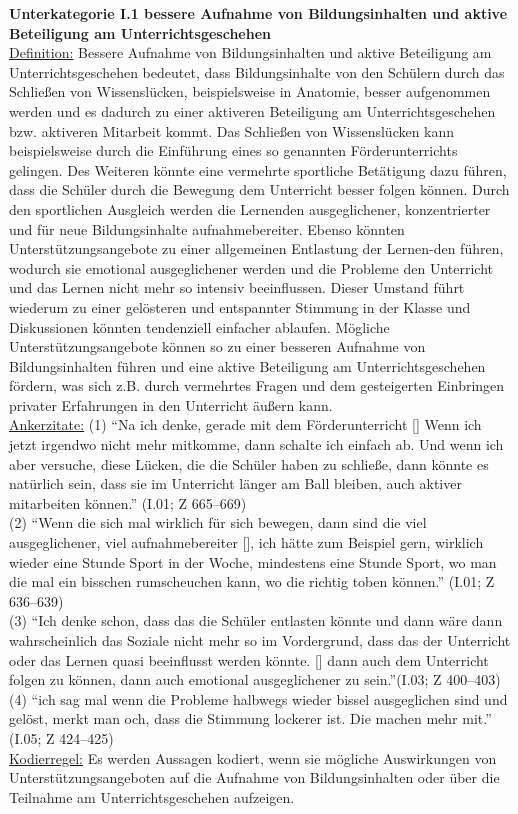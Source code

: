\noindent
\textbf{Unterkategorie I.1 bessere Aufnahme von Bildungsinhalten und aktive Beteiligung am Unterrichtsgeschehen}\\
\underline{Definition:} Bessere Aufnahme von Bildungsinhalten und aktive Beteiligung am Unterrichtsgeschehen bedeutet, dass Bildungsinhalte von den Schülern durch das Schließen von Wissenslücken, beispielsweise in Anatomie, besser aufgenommen werden und es dadurch zu einer aktiveren Beteiligung am Unterrichtsgeschehen bzw. aktiveren Mitarbeit kommt. Das Schließen von Wissenslücken kann beispielsweise durch die Einführung eines so genannten Förderunterrichts gelingen. Des Weiteren könnte eine vermehrte sportliche Betätigung dazu führen, dass die Schüler durch die Bewegung dem Unterricht besser folgen können. Durch den sportlichen Ausgleich werden die Lernenden ausgeglichener, konzentrierter und für neue Bildungsinhalte aufnahmebereiter. Ebenso könnten Unterstützungsangebote zu einer allgemeinen Entlastung der Lernen-den führen, wodurch sie emotional ausgeglichener werden und die Probleme den Unterricht und das Lernen nicht mehr so intensiv beeinflussen. Dieser Umstand führt wiederum zu einer gelösteren und entspannter Stimmung in der Klasse und Diskussionen könnten tendenziell einfacher ablaufen. Mögliche Unterstützungsangebote können so zu einer besseren Aufnahme von Bildungsinhalten führen und eine aktive Beteiligung am Unterrichtsgeschehen fördern, was sich z.B. durch vermehrtes Fragen und dem gesteigerten Einbringen privater Erfahrungen in den Unterricht äußern kann.\\
\underline{Ankerzitate:} (1) "`Na ich denke, gerade mit dem Förderunterricht [\punkte] Wenn ich jetzt irgendwo nicht mehr mitkomme, dann schalte ich einfach ab. Und wenn ich aber versuche, diese Lücken, die die Schüler haben zu schließe, dann könnte es natürlich sein, dass sie im Unterricht länger am Ball bleiben, auch aktiver mitarbeiten können."' (I.01; Z 665--669)\\ (2) "`Wenn die sich mal wirklich für sich bewegen, dann sind die viel ausgeglichener, viel aufnahmebereiter [\punkte], ich hätte zum Beispiel gern, wirklich wieder eine Stunde Sport in der Woche, mindestens eine Stunde Sport, wo man die mal ein bisschen rumscheuchen kann, wo die richtig toben können."' (I.01; Z 636--639)\\ (3) "`Ich denke schon, dass das die Schüler entlasten könnte und dann wäre dann wahrscheinlich das Soziale nicht mehr so im Vordergrund, dass das der Unterricht oder das Lernen quasi beeinflusst werden könnte. [\punkte] dann auch dem Unterricht folgen zu können, dann auch emotional ausgeglichener zu sein."'(I.03; Z 400--403)\\ (4) "`ich sag mal wenn die Probleme halbwegs wieder bissel ausgeglichen sind und gelöst, merkt man och, dass die Stimmung lockerer ist. Die machen mehr mit."' (I.05; Z 424--425)\\
\underline{Kodierregel:} Es werden Aussagen kodiert, wenn sie mögliche Auswirkungen von Unterstützungsangeboten auf die Aufnahme von Bildungsinhalten oder über die Teilnahme am Unterrichtsgeschehen aufzeigen.\\


